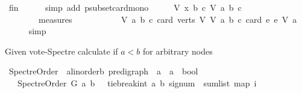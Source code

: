 \begin{isabellebody}
\ fin\isanewline
\ \ \ \ \isamarkupfalse%
\ {\isacharparenleft}{\kern0pt}simp\ add{\isacharcolon}{\kern0pt}\ psubset{\isacharunderscore}{\kern0pt}card{\isacharunderscore}{\kern0pt}mono{\isacharparenright}{\kern0pt}\isanewline
\ \ \isamarkupfalse%
\ \isamarkupfalse%
\ {\isachardoublequoteopen}{\isacharparenleft}{\kern0pt}{\isacharparenleft}{\kern0pt}V{\isacharcomma}{\kern0pt}\ x{\isacharcomma}{\kern0pt}\ b{\isacharcomma}{\kern0pt}\ c{\isacharparenright}{\kern0pt}{\isacharcomma}{\kern0pt}\ V{\isacharcomma}{\kern0pt}\ a{\isacharcomma}{\kern0pt}\ b{\isacharcomma}{\kern0pt}\ c{\isacharparenright}{\kern0pt}\isanewline
\ \ \ \ \ \ \ {\isasymin}\ measures\isanewline
\ \ \ \ \ \ \ \ \ \ \ {\isacharbrackleft}{\kern0pt}{\isasymlambda}{\isacharparenleft}{\kern0pt}V{\isacharcomma}{\kern0pt}\ a{\isacharcomma}{\kern0pt}\ b{\isacharcomma}{\kern0pt}\ c{\isacharparenright}{\kern0pt}{\isachardot}{\kern0pt}\ card\ {\isacharparenleft}{\kern0pt}verts\ V{\isacharparenright}{\kern0pt}{\isacharcomma}{\kern0pt}\ {\isasymlambda}{\isacharparenleft}{\kern0pt}V{\isacharcomma}{\kern0pt}\ a{\isacharcomma}{\kern0pt}\ b{\isacharcomma}{\kern0pt}\ c{\isacharparenright}{\kern0pt}{\isachardot}{\kern0pt}\ card\ {\isacharbraceleft}{\kern0pt}e{\isachardot}{\kern0pt}\ e\ {\isasymrightarrow}\isactrlsup {\isacharasterisk}{\kern0pt}\isactrlbsub V\isactrlesub \ a{\isacharbraceright}{\kern0pt}{\isacharbrackright}{\kern0pt}{\isachardoublequoteclose}\isanewline
\ \ \ \ \isamarkupfalse%
\ simp\isanewline
{}\isamarkupfalse%
%
\endisatagproof
{\isafoldproof}%
%
\isadelimproof
%
\endisadelimproof
%
\begin{isamarkuptext}%
Given vote-Spectre calculate if $a < b$ for arbitrary nodes%
\end{isamarkuptext}\isamarkuptrue%
\isamarkupfalse%
\ Spectre{\isacharunderscore}{\kern0pt}Order\ {\isacharcolon}{\kern0pt}{\isacharcolon}{\kern0pt}\ {\isachardoublequoteopen}{\isacharparenleft}{\kern0pt}{\isacharprime}{\kern0pt}a{\isacharcolon}{\kern0pt}{\isacharcolon}{\kern0pt}linorder{\isacharcomma}{\kern0pt}{\isacharprime}{\kern0pt}b{\isacharparenright}{\kern0pt}\ pre{\isacharunderscore}{\kern0pt}digraph\ {\isasymRightarrow}\ {\isacharprime}{\kern0pt}a\ {\isasymRightarrow}\ {\isacharprime}{\kern0pt}a\ {\isasymRightarrow}\ bool{\isachardoublequoteclose}\isanewline
\ \ \ {\isachardoublequoteopen}Spectre{\isacharunderscore}{\kern0pt}Order\ G\ a\ b\ {\isacharequal}{\kern0pt}\ {\isacharparenleft}{\kern0pt}\ tie{\isacharunderscore}{\kern0pt}break{\isacharunderscore}{\kern0pt}int\ a\ b\ {\isacharparenleft}{\kern0pt}signum\ {\isacharparenleft}{\kern0pt}\ sum{\isacharunderscore}{\kern0pt}list\ {\isacharparenleft}{\kern0pt}map\ {\isacharparenleft}{\kern0pt}{\isasymlambda}i{\isachardot}{\kern0pt}\isanewline

\end{isabellebody}
